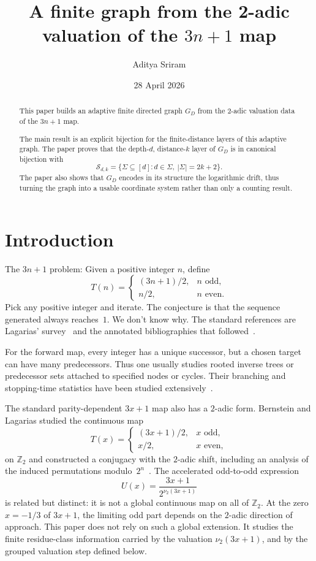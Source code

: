 \documentclass[11pt]{amsart}
\title{A finite graph from the 2-adic valuation of the \texorpdfstring{$3n+1$}{3n+1} map}
\author{Aditya Sriram}
\date{28 April 2026}
\theoremstyle{definition}
\theoremstyle{remark}
\newcommand{\Sfam}{\mathcal S}
\begin{document}
\begin{abstract}
\setlength{\parskip}{0.55em plus 0.1em minus 0.05em} 
\setlength{\parindent}{0pt} 
This paper builds an adaptive finite directed graph $G_D$ from the $2$-adic valuation
data of the $3n+1$ map.

The main result is an explicit bijection for the finite-distance layers of
this adaptive graph. The paper proves that the depth-$d$, distance-$k$ layer of $G_D$
is in canonical bijection with
\[
\Sfam_{d,k}
=
\{\Sigma\subseteq[d]:d\in\Sigma,\ |\Sigma|=2k+2\}.
\]
The paper also shows that $G_D$ encodes in its structure the logarithmic drift, 
thus turning the graph into a usable coordinate system rather than only a counting result.
\end{abstract}
\maketitle

\section{Introduction}\label{sec:introduction}
The $3n+1$ problem: Given a positive integer $n$, define
\[
T(n)=
\begin{cases}
(3n+1)/2, & n\text{ odd},\\
n/2, & n\text{ even}.
\end{cases}
\]
Pick any positive integer and iterate.  The conjecture is that the sequence generated always
reaches~$1$.  We don't know why.  The standard references are Lagarias'
survey~\cite{Lagarias1985} and the annotated bibliographies that
followed~\cite{LagariasAnnotated1999, LagariasAnnotated2009, Lagarias2010}.

For the forward map, every integer has a unique successor, but a
chosen target can have many predecessors.  Thus one usually studies rooted
inverse trees or predecessor sets attached to specified nodes or cycles.  Their
branching and stopping-time statistics have been studied
extensively~\cite{ApplegateLagarias1995, ApplegateLagarias2003, Wirsching1998}.

The standard parity-dependent $3x+1$ map also has a $2$-adic form.  Bernstein
and Lagarias studied the continuous map
\[
T(x)=
\begin{cases}
(3x+1)/2, & x\text{ odd},\\
x/2, & x\text{ even},
\end{cases}
\]
on $\mathbb Z_2$ and constructed a conjugacy with the $2$-adic shift, including
an analysis of the induced permutations modulo~$2^n$~\cite{Bernstein1994,
BernsteinLagarias1996}.  The accelerated odd-to-odd expression
\[
U(x)=\frac{3x+1}{2^{\nu_2(3x+1)}}
\]
is related but distinct: it is not a global continuous map on all of
$\mathbb Z_2$.  At the zero $x=-1/3$ of $3x+1$, the limiting odd part
depends on the $2$-adic direction of approach.  This paper does not rely on
such a global extension.  It studies the finite residue-class information
carried by the valuation $\nu_2(3x+1)$, and by the grouped valuation step
defined below.
\end{document}
